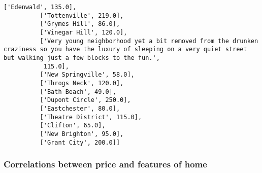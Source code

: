 \documentclass[11pt]{article}
\begin{document}
\begin{Verbatim}[commandchars=\\\{\}]
          ['Edenwald', 135.0],
          ['Tottenville', 219.0],
          ['Grymes Hill', 86.0],
          ['Vinegar Hill', 120.0],
          ['Very young neighborhood yet a bit removed from the drunken craziness so you have the luxury of sleeping on a very quiet street but walking just a few blocks to the fun.',
           115.0],
          ['New Springville', 58.0],
          ['Throgs Neck', 120.0],
          ['Bath Beach', 49.0],
          ['Dupont Circle', 250.0],
          ['Eastchester', 80.0],
          ['Theatre District', 115.0],
          ['Clifton', 65.0],
          ['New Brighton', 95.0],
          ['Grant City', 200.0]]
\end{Verbatim}
        
    \subsubsection{Correlations between price and features of
home}\label{correlations-between-price-and-features-of-home}
\end{document}
